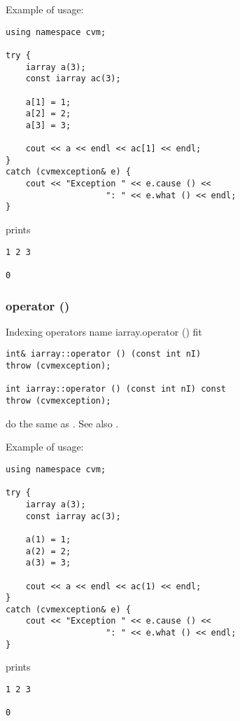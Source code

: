 Example of usage:
\begin{verbatim}
using namespace cvm;

try {
    iarray a(3);
    const iarray ac(3);

    a[1] = 1;
    a[2] = 2;
    a[3] = 3;

    cout << a << endl << ac[1] << endl;
}
catch (cvmexception& e) {
    cout << "Exception " << e.cause () <<
                    ": " << e.what () << endl;
}
\end{verbatim}
prints
\begin{verbatim}
1 2 3

0
\end{verbatim}
\newpage




\subsubsection{operator ()}
Indexing operators%
\pdfdest name {iarray.operator ()} fit
\begin{verbatim}
int& iarray::operator () (const int nI)
throw (cvmexception);

int iarray::operator () (const int nI) const
throw (cvmexception);
\end{verbatim}
do the same as .
See also .

Example of usage:
\begin{verbatim}
using namespace cvm;

try {
    iarray a(3);
    const iarray ac(3);

    a(1) = 1;
    a(2) = 2;
    a(3) = 3;

    cout << a << endl << ac(1) << endl;
}
catch (cvmexception& e) {
    cout << "Exception " << e.cause () <<
                    ": " << e.what () << endl;
}
\end{verbatim}
prints
\begin{verbatim}
1 2 3

0
\end{verbatim}
\newpage


